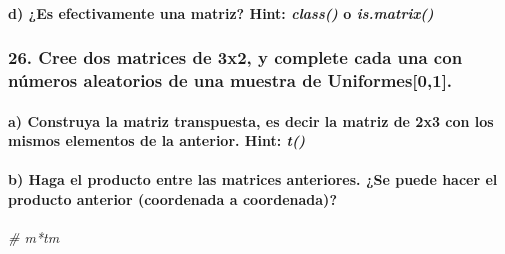 \documentclass[
]{article}
\newenvironment{Shaded}{\begin{snugshade}}{\end{snugshade}}
\newcommand{\CommentTok}[1]{\textcolor[rgb]{0.56,0.35,0.01}{\textit{#1}}}
\begin{document}
\hypertarget{d-es-efectivamente-una-matriz-hint-class-o-is.matrix}{%
\paragraph{\texorpdfstring{d) ¿Es efectivamente una matriz? Hint:
\emph{class()} o
\emph{is.matrix()}}{d) ¿Es efectivamente una matriz? Hint: class() o is.matrix()}}\label{d-es-efectivamente-una-matriz-hint-class-o-is.matrix}}

\hypertarget{cree-dos-matrices-de-3x2-y-complete-cada-una-con-nuxfameros-aleatorios-de-una-muestra-de-uniformes01.}{%
\subsubsection{26. Cree dos matrices de 3x2, y complete cada una con
números aleatorios de una muestra de
Uniformes{[}0,1{]}.}\label{cree-dos-matrices-de-3x2-y-complete-cada-una-con-nuxfameros-aleatorios-de-una-muestra-de-uniformes01.}}

\hypertarget{a-construya-la-matriz-transpuesta-es-decir-la-matriz-de-2x3-con-los-mismos-elementos-de-la-anterior.-hint-t}{%
\paragraph{\texorpdfstring{a) Construya la matriz transpuesta, es decir
la matriz de 2x3 con los mismos elementos de la anterior. Hint:
\emph{t()}}{a) Construya la matriz transpuesta, es decir la matriz de 2x3 con los mismos elementos de la anterior. Hint: t()}}\label{a-construya-la-matriz-transpuesta-es-decir-la-matriz-de-2x3-con-los-mismos-elementos-de-la-anterior.-hint-t}}

\hypertarget{b-haga-el-producto-entre-las-matrices-anteriores.-se-puede-hacer-el-producto-anterior-coordenada-a-coordenada}{%
\paragraph{b) Haga el producto entre las matrices anteriores. ¿Se puede
hacer el producto anterior (coordenada a
coordenada)?}\label{b-haga-el-producto-entre-las-matrices-anteriores.-se-puede-hacer-el-producto-anterior-coordenada-a-coordenada}}

\begin{Shaded}
\begin{Highlighting}[]
\CommentTok{\# m*tm}
\end{Highlighting}
\end{Shaded}
\end{document}
